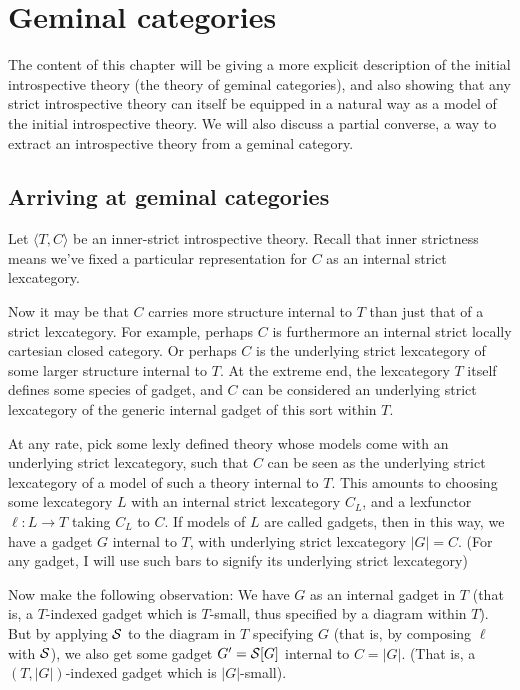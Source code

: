 \section{Geminal categories}
The content of this chapter will be giving a more explicit description of the initial introspective theory (the theory of geminal categories), and also showing that any strict introspective theory can itself be equipped in a natural way as a model of the initial introspective theory. We will also discuss a partial converse, a way to extract an introspective theory from a geminal category.

\subsection{Arriving at geminal categories}
\begin{observation}\label{IntrospContainsGLObservation}

Let $\langle T, C \rangle$ be an inner-strict introspective theory. Recall that inner strictness means we've fixed a particular representation for $C$ as an internal strict lexcategory.

Now it may be that $C$ carries more structure internal to $T$ than just that of a strict lexcategory. For example, perhaps $C$ is furthermore an internal strict locally cartesian closed category. Or perhaps $C$ is the underlying strict lexcategory of some larger structure internal to $T$. At the extreme end, the lexcategory $T$ itself defines some species of gadget, and $C$ can be considered an underlying strict lexcategory of the generic internal gadget of this sort within $T$.

At any rate, pick some lexly defined theory whose models come with an underlying strict lexcategory, such that $C$ can be seen as the underlying strict lexcategory of a model of such a theory internal to $T$. This amounts to choosing some lexcategory $L$ with an internal strict lexcategory $C_L$, and a lexfunctor $\ell: L \to T$ taking $C_L$ to $C$. If models of $L$ are called gadgets, then in this way, we have a gadget $G$ internal to $T$, with underlying strict lexcategory $|G| = C$. (For any gadget, I will use such bars to signify its underlying strict lexcategory)

Now make the following observation: We have $G$ as an internal gadget in $T$ (that is, a $T$-indexed gadget which is $T$-small, thus specified by a diagram within $T$). But by applying $\mathcal{S}$ to the diagram in $T$ specifying $G$ (that is, by composing $\ell$ with $\mathcal{S}$), we also get some gadget $G' = \mathcal{S}[G]$ internal to $C = |G|$. (That is, a $(T, |G|)$-indexed gadget which is $|G|$-small).


\end{observation}
